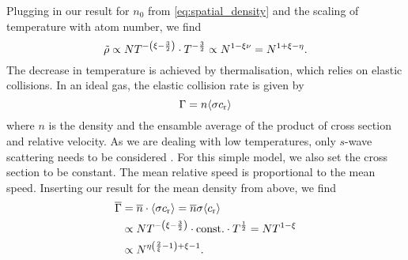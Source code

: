 Plugging in our result for $n_0$ from \eqref{eq:spatial_density} and the scaling of temperature with atom number, we find
\begin{equation*}
    \tilde{\rho} \propto NT^{-\left(\xi - \frac{3}{2}\right)} \cdot T^{-\frac{3}{2}} \propto N^{1 - \xi\nu} = N^{1 + \xi - \eta}.
\end{equation*}
The decrease in temperature is achieved by thermalisation, which relies on elastic collisions. In an ideal gas, the elastic collision rate \Rcoll is given by \cite[8]{bird1994}
\[
   \Gamma = n \langle\sigma c_\text{r}\rangle
\]
where $n$ is the density and \meanProb the ensamble average of the product of cross section and relative velocity. As we are dealing with low temperatures, only $s$-wave scattering needs to be considered \cite{joachain}. For this simple model, we also set the cross section to be constant. The mean relative speed is proportional to the mean speed. Inserting our result for the mean density from above, we find
\begin{align}
    \overline{\Gamma} &= \overline{n}\cdot \langle\sigma c_\text{r}\rangle = \overline{n} \sigma \langle c_\text{r}\rangle \nonumber \\
    &\propto NT^{-\left(\xi - \frac{3}{2}\right)} \cdot \text{const.} \cdot T^{\frac{1}{2}} \nonumber = NT^{1-\xi} \nonumber \\
    &\propto N^{\eta \left(\frac{2}{\xi} - 1\right) + \xi - 1}. \nonumber
\end{align}

